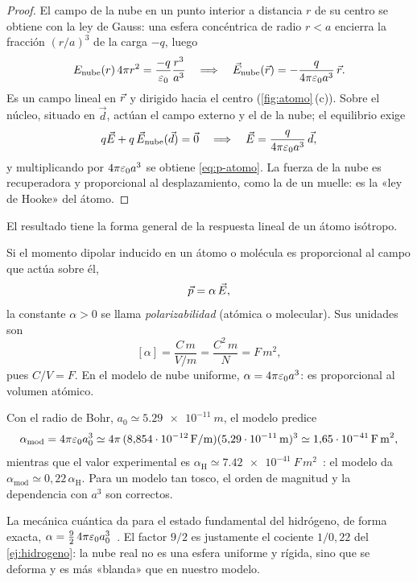 \begin{proof}
El campo de la nube en un punto interior a distancia $r$ de su centro se obtiene con la ley de Gauss: una
esfera concéntrica de radio $r<a$ encierra la fracción $(r/a)^3$ de la carga $-q$, luego
\[
  E_{\text{nube}}(r)\,4\pi r^2=\frac{-q}{\varepsilon_0}\frac{r^3}{a^3}
  \quad\Longrightarrow\quad
  \vec E_{\text{nube}}(\vec r)=-\frac{q}{4\pi\varepsilon_0 a^3}\,\vec r .
\]
Es un campo lineal en $\vec r$ y dirigido hacia el centro (\cref{fig:atomo}\,(c)). Sobre el núcleo, situado en
$\vec d$, actúan el campo externo y el de la nube; el equilibrio exige
\[
  q\vec E+q\,\vec E_{\text{nube}}(\vec d)=\vec 0
  \quad\Longrightarrow\quad
  \vec E=\frac{q}{4\pi\varepsilon_0 a^3}\,\vec d ,
\]
y multiplicando por $4\pi\varepsilon_0 a^3$ se obtiene \eqref{eq:p-atomo}. La fuerza de la nube es recuperadora y
proporcional al desplazamiento, como la de un muelle: es la «ley de Hooke» del átomo.
\end{proof}

El resultado tiene la forma general de la respuesta lineal de un átomo isótropo.

\begin{definicion}[Polarizabilidad]\label{def:polarizabilidad}
Si el momento dipolar inducido en un átomo o molécula es proporcional al campo que actúa sobre él,
\begin{equation}\label{eq:alfa}
  \vec p=\alpha\,\vec E ,
\end{equation}
la constante $\alpha>0$ se llama \emph{polarizabilidad} (atómica o molecular). Sus unidades son
\[
  [\alpha]=\frac{\si{C\,m}}{\si{V/m}}=\frac{\si{C^2\,m}}{\si{N}}=\si{F\,m^2},
\]
pues $\si{C/V}=\si{F}$. En el modelo de nube uniforme, $\alpha=4\pi\varepsilon_0 a^3$: es proporcional al volumen atómico.
\end{definicion}

\begin{ejemplo}\label{ej:hidrogeno}
Con el radio de Bohr, $a_0\simeq\SI{5.29e-11}{m}$, el modelo predice
\[
  \alpha_{\text{mod}}=4\pi\varepsilon_0 a_0^3\simeq 4\pi\,(\SI{8.854e-12}{F/m})(\SI{5.29e-11}{m})^3\simeq\SI{1.65e-41}{F\,m^2},
\]
mientras que el valor experimental es $\alpha_{\mathrm H}\simeq\SI{7.42e-41}{F\,m^2}$~\cite{Griffiths}: el modelo da
$\alpha_{\text{mod}}\simeq0{,}22\,\alpha_{\mathrm H}$. Para un modelo tan tosco, el orden de magnitud y la dependencia con
$a^3$ son correctos.
\end{ejemplo}

\begin{observacion}\label{obs:hidrogeno-cuantico}
La mecánica cuántica da para el estado fundamental del hidrógeno, de forma exacta,
$\alpha=\tfrac92\,4\pi\varepsilon_0 a_0^3$~\cite{Griffiths}. El factor $9/2$ es justamente el cociente $1/0{,}22$ del
\cref{ej:hidrogeno}: la nube real no es una esfera uniforme y rígida, sino que se deforma y es más
«blanda» que en nuestro modelo.
\end{observacion}

